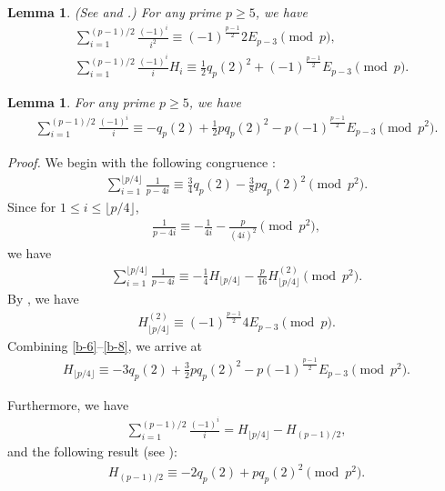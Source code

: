 \documentclass[12pt]{article}
\newtheorem{lem}[thm]{Lemma}
\numberwithin{equation}{section}
\begin{document}
\begin{lem}(See \cite[Lemma 2.4]{sunzw-scm-2011} and \cite[Lemma 2.9]{at-2019}.)
For any prime $p\ge 5$, we have
\begin{align}
&\sum_{i=1}^{(p-1)/2}\frac{(-1)^i}{i^2}\equiv(-1)^{\frac{p-1}{2}}2E_{p-3}\pmod{p},\label{b-3}\\[10pt]
&\sum_{i=1}^{(p-1)/2}\frac{(-1)^i}{i}H_i\equiv \frac{1}{2}q_p(2)^2+(-1)^{\frac{p-1}{2}}E_{p-3}\pmod{p}.\label{b-4}
\end{align}
\end{lem}

\begin{lem}
For any prime $p\ge 5$, we have
\begin{align}
\sum_{i=1}^{(p-1)/2}\frac{(-1)^i}{i}\equiv-q_p(2)+\frac{1}{2}pq_p(2)^2-p(-1)^{\frac{p-1}{2}}E_{p-3}\pmod{p^2}.
\label{b-5}
\end{align}
\end{lem}
{\noindent\it Proof.} We begin with the following congruence \cite[(43)]{lehmer-am-1938}:
\begin{align}
\sum_{i=1}^{\lfloor p/4\rfloor}\frac{1}{p-4i}\equiv \frac{3}{4}q_p(2)-\frac{3}{8}pq_p(2)^2\pmod{p^2}.\label{b-6}
\end{align}
Since for $1\le i\le \lfloor p/4\rfloor$,
\begin{align*}
\frac{1}{p-4i}\equiv -\frac{1}{4i}-\frac{p}{(4i)^2}\pmod{p^2},
\end{align*}
we have
\begin{align}
\sum_{i=1}^{\lfloor p/4\rfloor}\frac{1}{p-4i}\equiv -\frac{1}{4}H_{\lfloor p/4\rfloor}
-\frac{p}{16}H_{\lfloor p/4\rfloor}^{(2)}\pmod{p^2}.\label{b-7}
\end{align}
By \cite[page 359]{lehmer-am-1938}, we have
\begin{align}
H_{\lfloor p/4\rfloor}^{(2)}\equiv (-1)^{\frac{p-1}{2}}4E_{p-3}\pmod{p}. \label{b-8}
\end{align}
Combining \eqref{b-6}--\eqref{b-8}, we arrive at
\begin{align}
H_{\lfloor p/4\rfloor}\equiv -3q_p(2)+\frac{3}{2}pq_p(2)^2-p(-1)^{\frac{p-1}{2}}E_{p-3}
\pmod{p^2}.\label{b-9}
\end{align}

Furthermore, we have
\begin{align}
\sum_{i=1}^{(p-1)/2}\frac{(-1)^i}{i}=H_{\lfloor p/4\rfloor}-H_{(p-1)/2},\label{b-10}
\end{align}
and the following result (see \cite[(45)]{lehmer-am-1938}):
\begin{align}
H_{(p-1)/2}\equiv -2q_p(2)+pq_p(2)^2\pmod{p^2}.\label{b-11}
\end{align}
\end{document}
